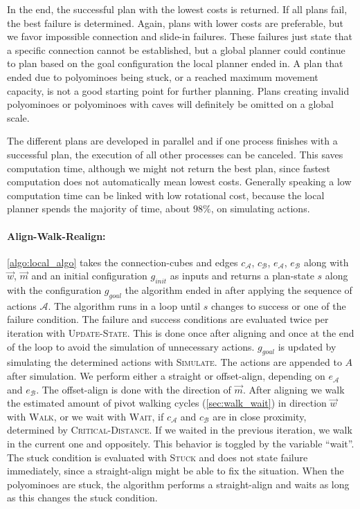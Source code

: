 In the end, the successful plan with the lowest costs is returned.
If all plans fail, the best failure is determined.
Again, plans with lower costs are preferable, but we favor impossible connection and slide-in failures.
These failures just state that a specific connection cannot be established, but a global planner could continue to plan based on the goal configuration the local planner ended in.
A plan that ended due to polyominoes being stuck, or a reached maximum movement capacity, is not a good starting point for further planning.
Plans creating invalid polyominoes or polyominoes with caves will definitely be omitted on a global scale.

The different plans are developed in parallel and if one process finishes with a successful plan, the execution of all other processes can be canceled.
This saves computation time, although we might not return the best plan, since fastest computation does not automatically mean lowest costs.
Generally speaking a low computation time can be linked with low rotational cost, because the local planner spends the majority of time, about $98\%$, on simulating actions.

\paragraph{Align-Walk-Realign:}

\autoref{algo:local_algo} takes the connection-cubes and edges $c_\mathcal{A}$, $c_\mathcal{B}$, $e_\mathcal{A}$, $e_\mathcal{B}$ along with $\vec{w}$, $\vec{m}$ and an initial configuration $g_\textit{init}$ as inputs and returns a plan-state $s$ along with the configuration $g_\textit{goal}$ the algorithm ended in after applying the sequence of actions $\mathcal{A}$.
The algorithm runs in a loop until $s$ changes to success or one of the failure condition.
The failure and success conditions are evaluated twice per iteration with {\scshape Update-State}.
This is done once after aligning and once at the end of the loop to avoid the simulation of unnecessary actions.
$g_\textit{goal}$ is updated by simulating the determined actions with {\scshape Simulate}.
The actions are appended to $A$ after simulation.
We perform either a straight or offset-align, depending on $e_\mathcal{A}$ and $e_\mathcal{B}$.
The offset-align is done with the direction of $\vec{m}$.
After aligning we walk the estimated amount of pivot walking cycles (\autoref{sec:walk_wait}) in direction $\vec{w}$ with {\scshape Walk}, or we wait with {\scshape Wait}, if $c_\mathcal{A}$ and $c_\mathcal{B}$ are in close proximity, determined by {\scshape Critical-Distance}.
If we waited in the previous iteration, we walk in the current one and oppositely.
This behavior is toggled by the variable ``wait''. 
The stuck condition is evaluated with {\scshape Stuck} and does not state failure immediately, since a straight-align might be able to fix the situation.
When the polyominoes are stuck, the algorithm performs a straight-align and waits as long as this changes the stuck condition.

